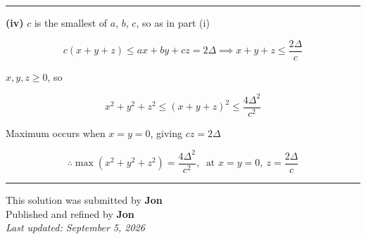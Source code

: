 \documentclass[12pt]{article}
\begin{document}
\bigskip\hrule\bigskip

\textbf{(iv)} $c$ is the smallest of $a$, $b$, $c$, so as in part (i)

$$c(x+y+z)\leq ax+by+cz=2\Delta\implies x+y+z\leq\frac{2\Delta}{c}$$

$x,y,z\geq0$, so

$$x^2+y^2+z^2\leq(x+y+z)^2\leq\frac{4\Delta^2}{c^2}$$

Maximum occurs when $x=y=0$, giving $cz=2\Delta$

$$\therefore \boxed{\max\left(x^2+y^2+z^2\right)=\frac{4\Delta^2}{c^2},\ \text{ at }x=y=0,\ z=\frac{2\Delta}{c}}$$

\bigskip
\hrule
\begin{center}
    This solution was submitted by \textbf{Jon}\\[4pt]
    Published and refined by \textbf{Jon}\\[8pt]
    \textit{Last updated: September 5, 2026}
\end{center}
\end{document}
